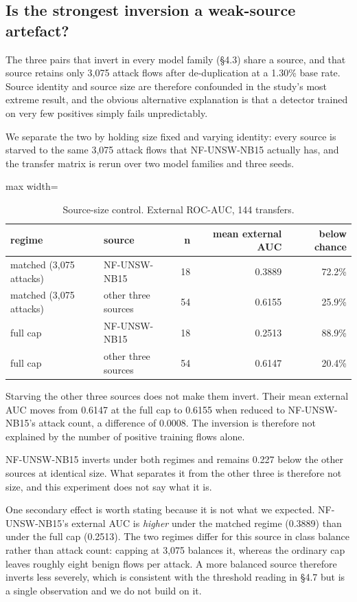 \documentclass[preprint,12pt,nopreprintline]{elsarticle}
\begin{document}
\subsection{Is the strongest inversion a weak-source artefact?}

The three pairs that invert in every model family (\S{}4.3) share a source, and that source retains only 3,075 attack flows after de-duplication at a 1.30\% base rate. Source identity and source size are therefore confounded in the study's most extreme result, and the obvious alternative explanation is that a detector trained on very few positives simply fails unpredictably.

We separate the two by holding size fixed and varying identity: every source is starved to the same 3,075 attack flows that NF-UNSW-NB15 actually has, and the transfer matrix is rerun over two model families and three seeds.

\begin{table}[htbp]\centering\scriptsize
\caption{Source-size control. External ROC-AUC, 144 transfers.}
\begin{adjustbox}{max width=\textwidth}\begin{tabular}{llrrr}
\toprule
regime & source & n & mean external AUC & below chance \\
\midrule
matched (3,075 attacks) & NF-UNSW-NB15 & 18 & 0.3889 & 72.2\% \\
matched (3,075 attacks) & other three sources & 54 & 0.6155 & 25.9\% \\
full cap & NF-UNSW-NB15 & 18 & 0.2513 & 88.9\% \\
full cap & other three sources & 54 & 0.6147 & 20.4\% \\
\bottomrule
\end{tabular}\end{adjustbox}
\end{table}

Starving the other three sources does not make them invert. Their mean external AUC moves from 0.6147 at the full cap to 0.6155 when reduced to NF-UNSW-NB15's attack count, a difference of 0.0008. The inversion is therefore not explained by the number of positive training flows alone.

NF-UNSW-NB15 inverts under both regimes and remains 0.227 below the other sources at identical size. What separates it from the other three is therefore not size, and this experiment does not say what it is.

One secondary effect is worth stating because it is not what we expected. NF-UNSW-NB15's external AUC is \emph{higher} under the matched regime (0.3889) than under the full cap (0.2513). The two regimes differ for this source in class balance rather than attack count: capping at 3,075 balances it, whereas the ordinary cap leaves roughly eight benign flows per attack. A more balanced source therefore inverts less severely, which is consistent with the threshold reading in \S{}4.7 but is a single observation and we do not build on it.
\end{document}
